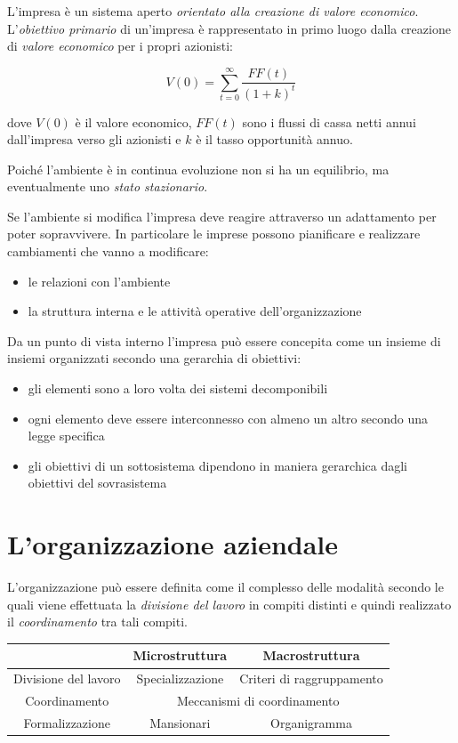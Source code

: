 L’impresa è un sistema aperto \emph{orientato alla creazione di valore
economico}.
L’\emph{obiettivo primario} di un’impresa è rappresentato in primo luogo
dalla creazione di \emph{valore economico} per i propri azionisti:

\[
V(0) = \sum_{t=0}^\infty \frac{FF(t)}{(1+k)^t}
\]

dove $V(0)$ è il valore economico, $FF(t)$ sono i flussi di cassa netti annui dall’impresa verso gli
azionisti e $k$ è il tasso opportunità annuo.

Poiché l’ambiente è in continua evoluzione non si ha un
equilibrio, ma eventualmente uno \emph{stato stazionario}.

Se l’ambiente si modifica l’impresa deve reagire attraverso un
adattamento per poter sopravvivere.
In particolare le imprese possono pianificare
e realizzare cambiamenti che vanno a modificare:
\begin{itemize}
	\item le relazioni con l’ambiente
	\item la struttura interna
e le	attività operative dell’organizzazione
\end{itemize}

Da un punto di vista interno l’impresa può essere concepita
come un insieme di insiemi organizzati secondo una
gerarchia di obiettivi:
\begin{itemize}
	\item gli elementi sono a loro volta dei sistemi decomponibili
	\item ogni elemento deve essere interconnesso con almeno un altro secondo una legge specifica
	\item gli obiettivi di un sottosistema dipendono in maniera
	gerarchica dagli obiettivi del sovrasistema
\end{itemize}

\section{L'organizzazione aziendale}
L'organizzazione può essere definita come il
complesso delle modalità secondo le quali
viene effettuata la \emph{divisione del lavoro} in
compiti distinti e quindi realizzato il
\emph{coordinamento} tra tali compiti.

\vspace{1em}
\begin{tabular}{|c|c|c|}
	\cline{2-3}
 	\multicolumn{1}{c|}{} & Microstruttura & Macrostruttura \\
	\hline
	Divisione del lavoro & Specializzazione & Criteri di raggruppamento \\
	\hline
	Coordinamento & \multicolumn{2}{c|}{Meccanismi di coordinamento} \\
	\hline\hline
	Formalizzazione & Mansionari & Organigramma \\
	\hline
\end{tabular}

